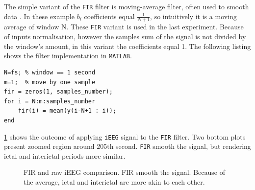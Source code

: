 The simple variant of the \verb|FIR| filter is moving-average filter, often used to smooth data \cite{fir_goerge_ellis}. In these example $b_i$ coefficients equal $\frac{1}{N+1}$, so intuitively it is a moving average of window N. These \verb|FIR| variant is used in the last experiment. Because of inputs normalisation, however the samples sum of the signal is not divided by the window's amount, in this variant the coefficients equal 1. The following listing shows the filter implementation in \verb|MATLAB|.
\begin{lstlisting}[style=custommatlab,frame=single]
N=fs; % window == 1 second
m=1;  % move by one sample
fir = zeros(1, samples_number);                  
for i = N:m:samples_number 
    fir(i) = mean(y(i-N+1 : i));
end
\end{lstlisting}
\figurename{} \ref{fig:fir_raw} shows the outcome of applying \verb|iEEG| signal to the \verb|FIR| filter. Two bottom plots present zoomed region around 205th second. \verb|FIR| smooth the signal, but rendering ictal and interictal periods more similar. 
\begin{figure}[H]
	\begin{center}
	\end{center}
	\caption{FIR and raw iEEG comparison. FIR smooth the signal. Because of the average, ictal and interictal are more akin to each other.}

	\label{fig:fir_raw}
\end{figure}
